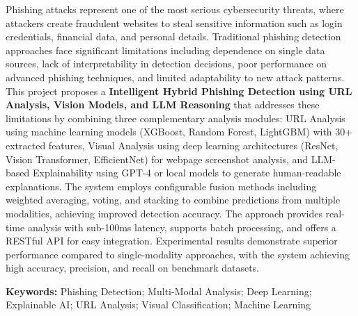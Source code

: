 \documentclass[12pt,a4paper]{report}
\begin{document}
\vspace{1cm}

Phishing attacks represent one of the most serious cybersecurity threats, where attackers create fraudulent websites to steal sensitive information such as login credentials, financial data, and personal details. Traditional phishing detection approaches face significant limitations including dependence on single data sources, lack of interpretability in detection decisions, poor performance on advanced phishing techniques, and limited adaptability to new attack patterns. This project proposes a \textbf{Intelligent Hybrid Phishing Detection using URL Analysis, Vision Models, and LLM Reasoning} that addresses these limitations by combining three complementary analysis modules: URL Analysis using machine learning models (XGBoost, Random Forest, LightGBM) with 30+ extracted features, Visual Analysis using deep learning architectures (ResNet, Vision Transformer, EfficientNet) for webpage screenshot analysis, and LLM-based Explainability using GPT-4 or local models to generate human-readable explanations. The system employs configurable fusion methods including weighted averaging, voting, and stacking to combine predictions from multiple modalities, achieving improved detection accuracy. The approach provides real-time analysis with sub-100ms latency, supports batch processing, and offers a RESTful API for easy integration. Experimental results demonstrate superior performance compared to single-modality approaches, with the system achieving high accuracy, precision, and recall on benchmark datasets.

\vspace{1cm}

\noindent\textbf{Keywords:} Phishing Detection; Multi-Modal Analysis; Deep Learning; Explainable AI; URL Analysis; Visual Classification; Machine Learning


\clearpage
{}
{}

\tableofcontents


\clearpage
{}
{}
\end{document}
